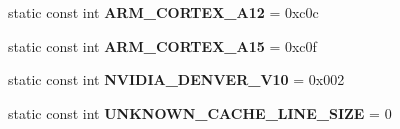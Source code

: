 \begin{DoxyCompactItemize}
\item 
static const int {\bfseries A\+R\+M\+\_\+\+C\+O\+R\+T\+E\+X\+\_\+\+A12} = 0xc0c\hypertarget{classv8_1_1base_1_1_c_p_u_a858cec98bb8f57c908b2799fe76d69da}{}\label{classv8_1_1base_1_1_c_p_u_a858cec98bb8f57c908b2799fe76d69da}

\item 
static const int {\bfseries A\+R\+M\+\_\+\+C\+O\+R\+T\+E\+X\+\_\+\+A15} = 0xc0f\hypertarget{classv8_1_1base_1_1_c_p_u_a810b59326516f957777cbb630e5c3b63}{}\label{classv8_1_1base_1_1_c_p_u_a810b59326516f957777cbb630e5c3b63}

\item 
static const int {\bfseries N\+V\+I\+D\+I\+A\+\_\+\+D\+E\+N\+V\+E\+R\+\_\+\+V10} = 0x002\hypertarget{classv8_1_1base_1_1_c_p_u_a86999f884a737c2d18357f236f94f522}{}\label{classv8_1_1base_1_1_c_p_u_a86999f884a737c2d18357f236f94f522}

\item 
static const int {\bfseries U\+N\+K\+N\+O\+W\+N\+\_\+\+C\+A\+C\+H\+E\+\_\+\+L\+I\+N\+E\+\_\+\+S\+I\+ZE} = 0\hypertarget{classv8_1_1base_1_1_c_p_u_a2ff081b104b72a6f54f4ce75d778f761}{}\label{classv8_1_1base_1_1_c_p_u_a2ff081b104b72a6f54f4ce75d778f761}

\end{DoxyCompactItemize}
